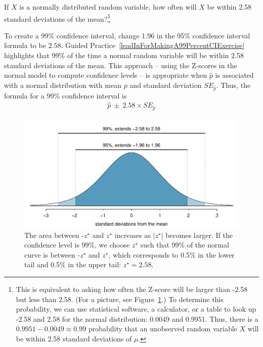 \begin{exercise} \label{leadInForMakingA99PercentCIExercise}
If $X$ is a normally distributed random variable, how often will $X$
be within 2.58 standard deviations of the mean?\footnote{This is
equivalent to asking how often the Z-score will be larger than -2.58
but less than 2.58. (For a picture, see Figure~\ref{choosingZForCI}.)
To determine this probability, we can use statistical software,
a calculator, or a table to look up -2.58 and 2.58 for the normal
distribution: 0.0049 and 0.9951. Thus, there is a
$0.9951-0.0049 \approx 0.99$ probability that an unobserved random
variable $X$ will be within 2.58 standard deviations of $\mu$.}
\end{exercise}

To create a 99\% confidence interval, change 1.96 in the 95\%
confidence interval formula to be $2.58$. Guided Practice~\ref{leadInForMakingA99PercentCIExercise} highlights
that 99\% of the time a normal random variable will be within
2.58 standard deviations of the mean. This approach -- using
the Z-scores in the normal model to compute confidence levels -- is
appropriate when $\hat{p}$ is associated with a normal distribution
with mean $p$ and standard deviation $SE_{\hat{p}}$. Thus, the formula
for a 99\% confidence interval is
\begin{eqnarray}
\hat{p}\ \pm\ 2.58\times SE_{\hat{p}}
\label{99PercCIForProp}
\end{eqnarray}

\begin{figure}
  \centering
  \includegraphics[width=\textwidth]{ch_inference_for_props/figures/choosingZForCI/choosingZForCI}
  \caption{The area between -$z^{\star}$ and $z^{\star}$ increases as
      $|z^{\star}|$ becomes larger. If the confidence level is 99\%,
      we choose $z^{\star}$ such that 99\% of the normal curve is
      between -$z^{\star}$ and $z^{\star}$, which corresponds to 0.5\%
      in the lower tail and 0.5\% in the upper tail: $z^{\star}=2.58$.}
\label{choosingZForCI}
\end{figure}

